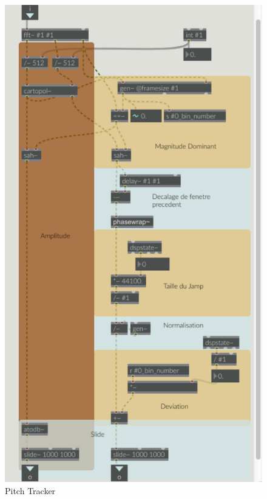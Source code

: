    \begin{figure}
        \centering
        \includegraphics[width = 0.8 \textwidth ]{Graphs/ffttracker.png}
        \caption{Pitch Tracker}
        \label{PitchTracker}
    \end{figure}

